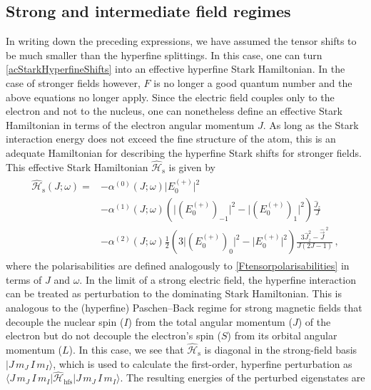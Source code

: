 \documentclass[../Thesis-IJspeert.tex]{subfiles}
\begin{document}
\subsection{Strong and intermediate field regimes}
In writing down the preceding expressions, we have assumed the tensor shifts to be much smaller than the hyperfine splittings. In this case, one can turn \autoref{acStarkHyperfineShifts} into an effective hyperfine Stark Hamiltonian. In the case of stronger fields however, $F$ is no longer a good quantum number and the above equations no longer apply. Since the electric field couples only to the electron and not to the nucleus, one can nonetheless define an effective Stark Hamiltonian in terms of the electron angular momentum $J$. As long as the Stark interaction energy does not exceed the fine structure of the atom, this is an adequate Hamiltonian for describing the hyperfine Stark shifts for stronger fields. This effective Stark Hamiltonian $\hat{\mathcal{H}}_\text{s}$ is given by
\begin{align}
\label{effectivestarkhamiltonian}
\begin{split}
\hat{\mathcal{H}}_\text{s}\left(J;\omega\right) = &- \alpha^{(0)}\left(J;\omega\right) \lvert E_0^{(+)}\rvert ^2 \\&- \alpha^{(1)} \left(J;\omega\right)   \left( \lvert (E_0^{(+)})_{-1}\rvert ^2 - \lvert (E_0^{(+)})_{1}\rvert ^2  \right)    \frac{\hat{J}_z}{J}   \\&- \alpha^{(2)}\left(J;\omega\right)\frac{1}{2}\left(3\lvert (E_{0}^{(+)})_0 \rvert ^2 - \lvert E_0^{(+)}\rvert ^2 \right) \frac{3{\hat{J}}_z^2-\hat{\vec{J}}^{\,2}}{J\left(2J-1\right)} \,,
\end{split}
\end{align}
where the polarisabilities are defined analogously to \autoref{Ftensorpolarisabilities} in terms of $J$ and $\omega$. In the limit of a strong electric field, the hyperfine interaction can be treated as perturbation to the dominating Stark Hamiltonian. This is analogous to the (hyperfine) Paschen–Back regime for strong magnetic fields that decouple the nuclear spin ($I$) from the total angular momentum ($J$) of the electron but do not decouple the electron's spin ($S$) from its orbital angular momentum ($L$). In this case, we see that $\hat{\mathcal{H}}_\text{s}$ is diagonal in the strong-field basis $\vert J\, m_J\, I\, m_I\rangle$, which is used to calculate the first-order, hyperfine perturbation as $\langle J\, m_J\, I\, m_I \vert \hat{\mathcal{H}}_{\text{hfs}} \vert J\, m_J\, I\, m_I\rangle$. The resulting energies of the perturbed eigenstates are
\end{document}
